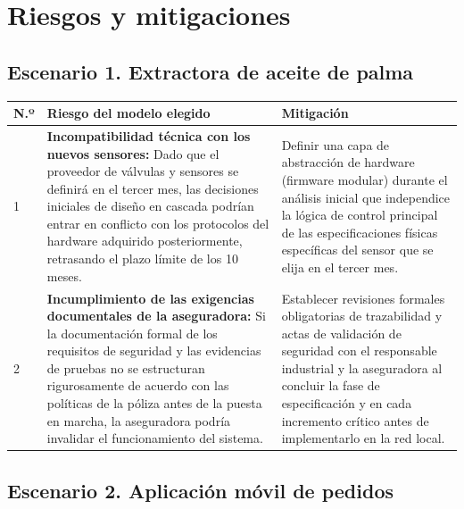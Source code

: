 \documentclass[11pt,a4paper]{article}
\begin{document}
	
	\section{Riesgos y mitigaciones}
	
	\subsection{Escenario 1. Extractora de aceite de palma}
	
	\begin{tabularx}{\textwidth}{|p{1.5cm}|Y|Y|}
	\hline
	\textbf{N.º} & \textbf{Riesgo del modelo elegido} & \textbf{Mitigación} \\ \hline
	
	1 &
	\textbf{Incompatibilidad técnica con los nuevos sensores:} Dado que el proveedor de válvulas y sensores se definirá en el tercer mes, las decisiones iniciales de diseño en cascada podrían entrar en conflicto con los protocolos del hardware adquirido posteriormente, retrasando el plazo límite de los 10 meses. &
	Definir una capa de abstracción de hardware (firmware modular) durante el análisis inicial que independice la lógica de control principal de las especificaciones físicas específicas del sensor que se elija en el tercer mes. \\ \hline
	
	2 &
	\textbf{Incumplimiento de las exigencias documentales de la aseguradora:} Si la documentación formal de los requisitos de seguridad y las evidencias de pruebas no se estructuran rigurosamente de acuerdo con las políticas de la póliza antes de la puesta en marcha, la aseguradora podría invalidar el funcionamiento del sistema. &
	Establecer revisiones formales obligatorias de trazabilidad y actas de validación de seguridad con el responsable industrial y la aseguradora al concluir la fase de especificación y en cada incremento crítico antes de implementarlo en la red local. \\ \hline
\end{tabularx}
	
	\subsection{Escenario 2. Aplicación móvil de pedidos}
	
\end{document}
